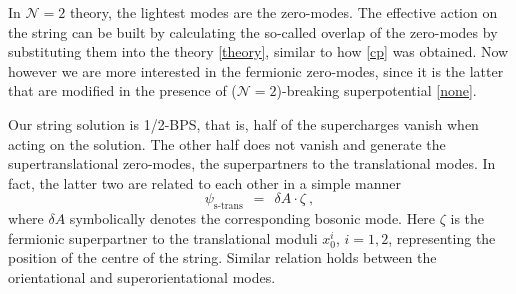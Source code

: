 \documentclass[12pt]{article}
\def\beq{\begin{equation}}
\def\eeq{\end{equation}}
\newcommand{\ntwo}{${\mathcal N}=2$ }
\newcommand{\ntwon}{${\mathcal N}=2$}
\begin{document}
	In \ntwo theory, the lightest modes are the zero-modes. 
	The effective action on the string can be built by calculating the so-called overlap of the zero-modes 
	by substituting them into the theory \eqref{theory}, similar to how \eqref{cp} was obtained.
	Now however we are more interested in the fermionic zero-modes, since it is the latter that
	are modified in the presence of (\ntwon)-breaking superpotential \eqref{none}.

	Our string solution  is 1/2-BPS, that is, half of the supercharges vanish when acting on the solution.
	The other half does not vanish and generate the supertranslational zero-modes, the superpartners 
	to the translational modes.
	In fact, the latter two are related to each other in a simple manner \cite{Edalati}
\beq
\label{bos_ferm_rel}
	\psi_{\text{s-trans}} ~~=~~  \delta A \cdot \zeta~,
\eeq
	where $ \delta A $ symbolically denotes the corresponding bosonic mode.
	Here $ \zeta $ is the 
	fermionic superpartner to the translational moduli $ x_0^i $, $ i = 1, 2 $, representing the position of the 
	centre of the string.
	Similar relation holds between the orientational and superorientational modes.
\end{document}
